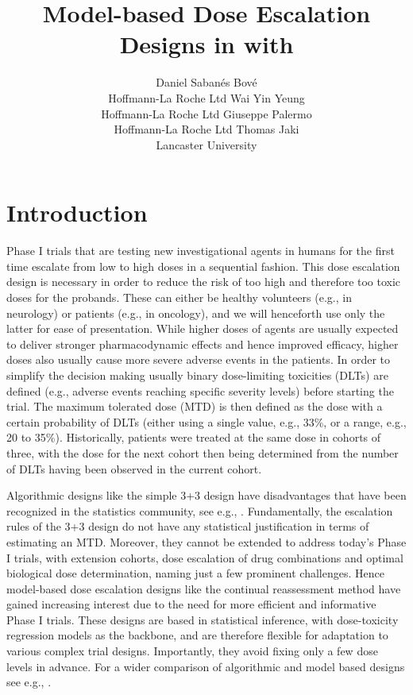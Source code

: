 \documentclass[article]{jss}\usepackage[]{graphicx}\usepackage[]{color}
\author{Daniel Saban\'es Bov\'e\\Hoffmann-La Roche Ltd \And
        Wai Yin Yeung\\Hoffmann-La Roche Ltd \And
        Giuseppe Palermo\\Hoffmann-La Roche Ltd \And
        Thomas Jaki\\Lancaster University}
\title{Model-based Dose Escalation Designs in \proglang{R} with \pkg{crmPack}}
\begin{document}


\section{Introduction}
\label{sec:introduction}

Phase I trials that are testing new investigational agents in humans 
for the first time escalate from low to high doses in a sequential fashion. 
This dose escalation design is necessary
in order to reduce the risk of too high and therefore too toxic doses for the probands. 
These can either be healthy volunteers (e.g., in neurology) or patients
(e.g., in oncology), and we will henceforth use only the latter for ease of
presentation. While higher doses of agents are usually expected to deliver
stronger pharmacodynamic effects and hence improved efficacy, higher doses also
usually cause more severe adverse events in the patients. In order to simplify
the decision making usually binary dose-limiting toxicities (DLTs) are defined
(e.g., adverse events reaching specific severity levels) before starting the
trial. The maximum tolerated dose (MTD) is then defined as the dose with a
certain probability of DLTs (either using a single value, e.g., 33\%, or a
range, e.g., 20 to 35\%). Historically, patients were treated at the same
dose in cohorts of three, with the dose for the next cohort then being
determined from the number of DLTs having been observed in the current cohort.

Algorithmic designs like the simple 3+3 design \citep{carter1973} have
disadvantages that have been recognized in the statistics community, see e.g.,
\cite{Paoletti2015}. Fundamentally, the escalation rules of the 3+3 design do
not have any statistical justification \citep{Storer1989} in terms of estimating
an MTD. Moreover, they cannot be extended to address today's Phase I trials,
with extension cohorts, dose escalation of drug combinations and optimal
biological dose determination, naming just a few prominent challenges. Hence
model-based dose escalation designs like the continual reassessment method
\citep[CRM,][]{oquigley1990} have gained increasing interest due to the need for
more efficient and informative Phase I trials. These designs are based in
statistical inference, with dose-toxicity regression models as the backbone, and
are therefore flexible for adaptation to various complex trial designs.
Importantly, they avoid fixing only a few dose levels in advance. For a wider comparison of algorithmic and model based designs see e.g., \cite{jaki2013}.
\end{document}
